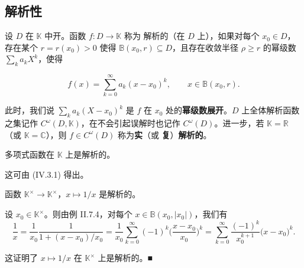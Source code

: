 \subsection*{解析性}

设 $D$ 在 $\mathbb{K}$ 中开。函数 $f: D \to \mathbb{K}$ 称为 $\text{解析的}$（在 $D$ 上），如果对每个 $x_0 \in D$，存在某个 $r = r(x_0) > 0$ 使得 $\mathbb{B}(x_0, r) \subseteq D$，且存在收敛半径 $\rho \geq r$ 的幂级数 $\sum_k a_k X^k$，使得

\[
f(x)=\sum_{k=0}^{\infty}a_{k}(x-x_{0})^{k},\qquad x\in\mathbb{B}(x_{0},r).
\]

此时，我们说 $ \sum_k a_k(X - x_0)^k $ 是 $ f $ 在 $ x_0 $ 处的\textbf{幂级数展开}。$ D $ 上全体解析函数之集记作 $ C^\omega(D, \mathbb{K}) $，在不会引起误解时也记作 $ C^\omega(D) $。进一步，若 $ \mathbb{K} = \mathbb{R} $（或 $ \mathbb{K} = \mathbb{C} $），则 $ f \in C^\omega(D) $ 称为\textbf{实}（或 \textbf{复}）\textbf{解析的}。

\begin{example}

\begin{items}
\item

多项式函数在 $ \mathbb{K} $ 上是解析的。

\proofhead
这可由 (IV.3.1) 得出。
\item

函数 $ \mathbb{K}^{\times} \to \mathbb{K}^{\times} $，$ x \mapsto 1/x $ 是解析的。

\proofhead
设 $ x_0 \in \mathbb{K}^\times $。则由例 II.7.4，对每个 $ x \in \mathbb{B}(x_0, |x_0|) $，我们有
\[
\frac{1}{x}=\frac{1}{x_{0}}\frac{1}{1+(x-x_{0})/x_{0}}=\frac{1}{x_{0}}\sum_{k=0}^{\infty}(-1)^{k}\Big(\frac{x-x_{0}}{x_{0}}\Big)^{k}=\sum_{k=0}^{\infty}\frac{(-1)^{k}}{x_{0}^{k+1}}\big(x-x_{0}\big)^{k}.
\]

这证明了 $ x \mapsto 1/x $ 在 $ \mathbb{K}^\times $ 上是解析的。■

\end{items}

\end{example}

